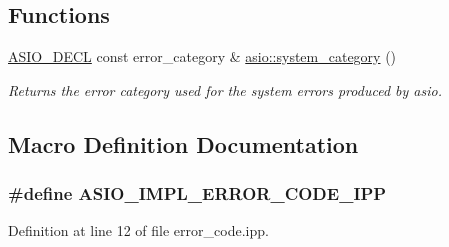 \subsection*{Functions}
\begin{DoxyCompactItemize}
\item 
\hyperlink{config_8hpp_ab54d01ea04afeb9a8b39cfac467656b7}{A\+S\+I\+O\+\_\+\+D\+E\+C\+L} const error\+\_\+category \& \hyperlink{namespaceasio_a1776aa9a745f4da041978ce17abc44ff}{asio\+::system\+\_\+category} ()
\begin{DoxyCompactList}\small\item\em Returns the error category used for the system errors produced by asio. \end{DoxyCompactList}\end{DoxyCompactItemize}


\subsection{Macro Definition Documentation}
\hypertarget{error__code_8ipp_a5dbf4995fa61bbf3ba7341975e7379ab}{}
\subsubsection[{A\+S\+I\+O\+\_\+\+I\+M\+P\+L\+\_\+\+E\+R\+R\+O\+R\+\_\+\+C\+O\+D\+E\+\_\+\+I\+P\+P}]{\setlength{\rightskip}{0pt plus 5cm}\#define A\+S\+I\+O\+\_\+\+I\+M\+P\+L\+\_\+\+E\+R\+R\+O\+R\+\_\+\+C\+O\+D\+E\+\_\+\+I\+P\+P}\label{error__code_8ipp_a5dbf4995fa61bbf3ba7341975e7379ab}


Definition at line 12 of file error\+\_\+code.\+ipp.

